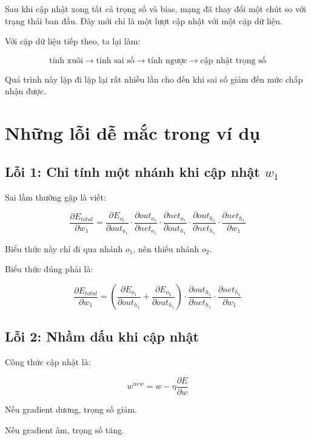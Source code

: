 Sau khi cập nhật xong tất cả trọng số và bias, mạng đã thay đổi một chút so với trạng thái ban đầu. Đây mới chỉ là một lượt cập nhật với một cặp dữ liệu.

Với cặp dữ liệu tiếp theo, ta lại làm:

\[
    \text{tính xuôi}
    \rightarrow
    \text{tính sai số}
    \rightarrow
    \text{tính ngược}
    \rightarrow
    \text{cập nhật trọng số}
\]

Quá trình này lặp đi lặp lại rất nhiều lần cho đến khi sai số giảm đến mức chấp nhận được.

\section{Những lỗi dễ mắc trong ví dụ}

\subsection{Lỗi 1: Chỉ tính một nhánh khi cập nhật $w_1$}

Sai lầm thường gặp là viết:

\[
    \frac{\partial E_{total}}{\partial w_1}
    =
    \frac{\partial E_{o_1}}{\partial out_{o_1}}
    \cdot
    \frac{\partial out_{o_1}}{\partial net_{o_1}}
    \cdot
    \frac{\partial net_{o_1}}{\partial out_{h_1}}
    \cdot
    \frac{\partial out_{h_1}}{\partial net_{h_1}}
    \cdot
    \frac{\partial net_{h_1}}{\partial w_1}
\]

Biểu thức này chỉ đi qua nhánh $o_1$, nên thiếu nhánh $o_2$.

Biểu thức đúng phải là:

\[
    \frac{\partial E_{total}}{\partial w_1}
    =
    \left(
    \frac{\partial E_{o_1}}{\partial out_{h_1}}
    +
    \frac{\partial E_{o_2}}{\partial out_{h_1}}
    \right)
    \cdot
    \frac{\partial out_{h_1}}{\partial net_{h_1}}
    \cdot
    \frac{\partial net_{h_1}}{\partial w_1}
\]

\subsection{Lỗi 2: Nhầm dấu khi cập nhật}

Công thức cập nhật là:

\[
    w^{new}=w-\eta\frac{\partial E}{\partial w}
\]

Nếu gradient dương, trọng số giảm.

Nếu gradient âm, trọng số tăng.

